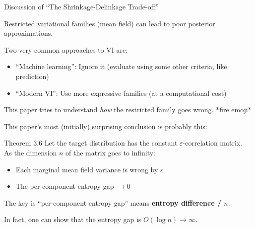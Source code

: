 \documentclass[8pt]{beamer}\usepackage[]{graphicx}\usepackage[]{color}
\begin{document}

\begin{frame}{Discussion of ``The Shrinkage-Delinkage Trade-off''}

Restricted variational families (mean field) can lead to poor posterior approximations.

Two very common approaches to VI are:
%
\begin{itemize}
\item ``Machine learning'': Ignore it (evaluate using some other criteria, like prediction)
\item ``Modern VI'': Use more expressive families (at a computational cost)
\end{itemize}
%
This paper tries to understand \emph{how} the restricted family goes wrong.  *fire emoji*

\pause
\hrulefill

This paper's most (initially) surprising conclusion is probably this:

\begin{block}{Theorem 3.6}
%
Let the target distribution has the constant $\varepsilon$-correlation matrix.\\
As the dimension $n$ of the matrix goes to infinity:
%
\begin{itemize}
\item Each marginal mean field variance is wrong by $\varepsilon$
\item The per-component entropy gap $\rightarrow 0$
\end{itemize}
%
\end{block}


\pause
The key is ``per-component entropy gap'' means \textbf{entropy difference / $n$}.


In fact, one can show that the entropy gap is $O(\log n) \rightarrow \infty$.
%
%


\end{frame}
\end{document}
